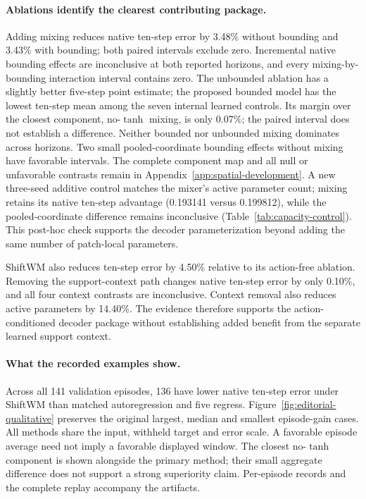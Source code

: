 


\paragraph{Ablations identify the clearest contributing package.}
Adding mixing reduces native ten-step error by 3.48\% without bounding and
3.43\% with bounding; both paired intervals exclude zero. Incremental native
bounding effects are inconclusive at both reported horizons, and every
mixing-by-bounding interaction interval contains zero. The unbounded ablation
has a slightly better five-step point estimate; the proposed bounded model
has the lowest ten-step mean among the seven internal learned controls. Its
margin over the closest component, no-$\tanh$ mixing, is only 0.07\%; the paired
interval does not establish a difference. Neither bounded nor
unbounded mixing dominates across horizons. Two small pooled-coordinate bounding effects
without mixing have favorable intervals. The complete component map and all
null or unfavorable contrasts remain in Appendix~\ref{app:spatial-development}.
A new three-seed additive control matches the mixer's active parameter count;
mixing retains its native ten-step advantage (0.193141 versus 0.199812),
while the pooled-coordinate difference remains inconclusive
(Table~\ref{tab:capacity-control}). This post-hoc check supports the decoder
parameterization beyond adding the same number of patch-local parameters.

ShiftWM also reduces ten-step error by 4.50\% relative to its action-free
ablation. Removing the support-context path changes native ten-step error by
only 0.10\%, and all four context contrasts are inconclusive. Context removal
also reduces active parameters by 14.40\%. The evidence therefore supports
the action-conditioned decoder package without establishing added benefit
from the separate learned support context.

\paragraph{What the recorded examples show.}
Across all 141 validation episodes, 136 have lower native ten-step error
under ShiftWM than matched autoregression and five regress.
Figure~\ref{fig:editorial-qualitative} preserves the original largest, median
and smallest episode-gain cases. All methods share the input, withheld target
and error scale. A favorable episode average need not imply a favorable
displayed window. The closest no-$\tanh$ component is shown alongside the
primary method; their small aggregate difference does not support a strong
superiority claim. Per-episode records and the complete replay accompany the
artifacts.

